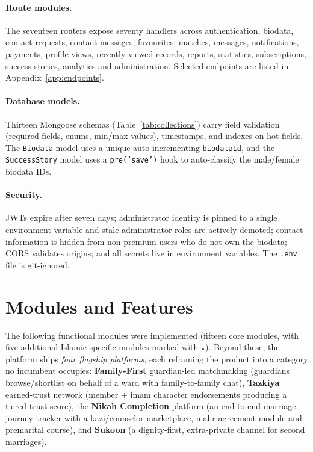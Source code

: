 \documentclass[12pt,a4paper]{report}
\begin{document}
\paragraph{Route modules.} The seventeen routers expose seventy handlers across
authentication, biodata, contact requests, contact messages, favourites,
matches, messages, notifications, payments, profile views, recently-viewed
records, reports, statistics, subscriptions, success stories, analytics and
administration. Selected endpoints are listed in Appendix~\ref{app:endpoints}.

\paragraph{Database models.} Thirteen Mongoose schemas (Table~\ref{tab:collections})
carry field validation (required fields, enums, min/max values), timestamps,
and indexes on hot fields. The \texttt{Biodata} model uses a unique
auto-incrementing \texttt{biodataId}, and the \texttt{SuccessStory} model uses
a \texttt{pre('save')} hook to auto-classify the male/female biodata IDs.

\paragraph{Security.} JWTs expire after seven days; administrator identity is
pinned to a single environment variable and stale administrator roles are
actively demoted; contact information is hidden from non-premium users who do
not own the biodata; CORS validates origins; and all secrets live in
environment variables. The \texttt{.env} file is git-ignored.

\section{Modules and Features}
The following functional modules were implemented (fifteen core modules, with five additional Islamic-specific modules marked with $\star$). Beyond these, the platform ships \emph{four flagship platforms}, each reframing the product into a category no incumbent occupies: \textbf{Family-First} guardian-led matchmaking (guardians browse/shortlist on behalf of a ward with family-to-family chat), \textbf{Tazkiya} earned-trust network (member + imam character endorsements producing a tiered trust score), the \textbf{Nikah Completion} platform (an end-to-end marriage-journey tracker with a kazi/counselor marketplace, mahr-agreement module and premarital course), and \textbf{Sukoon} (a dignity-first, extra-private channel for second marriages).
\end{document}
